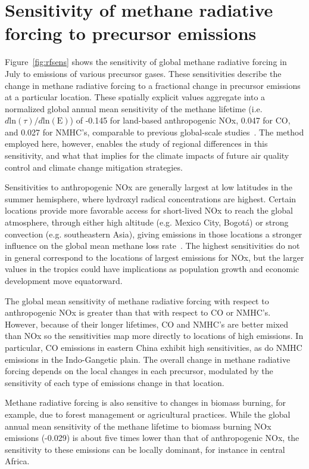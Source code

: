 \section{Sensitivity of methane radiative forcing to precursor emissions}

Figure~\ref{fig:rfsens} shows the sensitivity of global methane radiative forcing in July to emissions of various precursor gases. These sensitivities describe the change in methane radiative forcing to a fractional change in precursor emissions at a particular location. These spatially explicit values aggregate into a normalized global annual mean sensitivity of the methane lifetime (i.e. $d \mathrm{ln}(\tau)/d\mathrm{ln}(\mathrm{E})$) of -0.145 for land-based anthropogenic NOx, 0.047 for CO, and 0.027 for NMHC's, comparable to previous global-scale studies~\citep{ref:fry2012,ref:holmes2013}. The method employed here, however, enables the study of regional differences in this sensitivity, and what that implies for the climate impacts of future air quality control and climate change mitigation strategies.


Sensitivities to anthropogenic NOx are generally largest at low latitudes in the summer hemisphere, where hydroxyl radical concentrations are highest. Certain locations provide more favorable access for short-lived NOx to reach the global atmosphere, through either high altitude (e.g. Mexico City, Bogot\'a) or strong convection (e.g. southeastern Asia), giving emissions in those locations a stronger influence on the global mean methane loss rate~\citep{ref:bowman2012}. The highest sensitivities do not in general correspond to the locations of largest emissions for NOx, but the larger values in the tropics could have implications as population growth and economic development move equatorward.

The global mean sensitivity of methane radiative forcing with respect to anthropogenic NOx is greater than that with respect to CO or NMHC's. However, because of their longer lifetimes, CO and NMHC's are better mixed than NOx so the sensitivities map more directly to locations of high emissions. In particular, CO emissions in eastern China exhibit high sensitivities, as do NMHC emissions in the Indo-Gangetic plain. The overall change in methane radiative forcing depends on the local changes in each precursor, modulated by the sensitivity of each type of emissions change in that location.

Methane radiative forcing is also sensitive to changes in biomass burning, for example, due to forest management or agricultural practices. While the global annual mean sensitivity of the methane lifetime to biomass burning NOx emissions (-0.029) is about five times lower than that of anthropogenic NOx, the sensitivity to these emissions can be locally dominant, for instance in central Africa.

